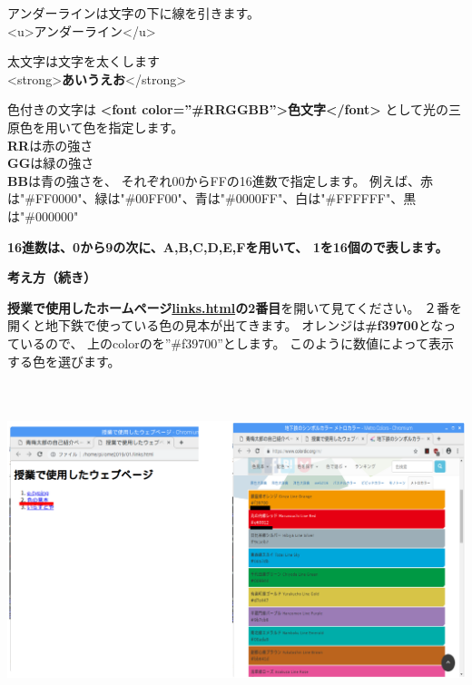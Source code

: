 \documentclass[a4paper,12pt]{jarticle}
\begin{document}
\bigskip

アンダーラインは文字の下に線を引きます。\\
{\textless}u{\textgreater}アンダーライン{\textless}/u{\textgreater}\\

\bigskip

太文字は文字を太くします\\
{\textless}strong{\textgreater}\textbf{あいうえお}{\textless}/strong{\textgreater}


\bigskip
色付きの文字は
\textbf{{\textless}font color=”\#RRGGBB”{\textgreater}色文字{\textless}/font{\textgreater}}
として光の三原色を用いて色を指定します。\\
\textbf{RR}は赤の強さ\\
\textbf{GG}は緑の強さ\\
\textbf{BB}は青の強さを、
それぞれ00からFFの16進数で指定します。
例えば、赤は"\#FF0000"、緑は"\#00FF00"、青は"\#0000FF"、白は"\#FFFFFF"、黒は"\#000000"

\bigskip
\textbf{16進数は、0から9の次に、A,B,C,D,E,Fを用いて、
  1を16個ので表します。}

\bigskip



\clearpage
\textbf{考え方（続き）}



\textbf{授業で使用したホームページ\url{links.html}の2番目}を開いて見てください。
２番を開くと地下鉄で使っている色の見本が出てきます。
オレンジは\textbf{\#f39700}となっているので、
上のcolorのを”\#f39700”とします。
このように数値によって表示する色を選びます。



\bigskip

\includegraphics[width=16.39cm,height=9.698cm]{textbook-img187.png}
\end{document}

